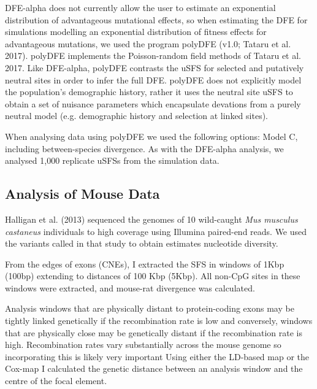 \documentclass[11pt]{article}
\begin{document}
		DFE-alpha does not currently allow the user to estimate an exponential distribution of advantageous mutational effects, so when estimating the DFE for simulations modelling an exponential distribution of fitness effects for advantageous mutations, we used the program polyDFE (v1.0; Tataru et al. 2017). polyDFE implements the Poisson-random field methods of Tataru et al. 2017. Like DFE-alpha, polyDFE contrasts the uSFS for selected and putatively neutral sites in order to infer the full DFE. polyDFE does not explicitly model the population's demographic history, rather it uses the neutral site uSFS to obtain a set of nuisance parameters which encapsulate devations from a purely neutral model (e.g. demographic history and selection at linked sites).
		
	 When analysing data using polyDFE we used the following options: Model C, including between-species divergence. As with the DFE-alpha analysis, we analysed 1,000 replicate uSFSs from the simulation data.

	\subsection*{Analysis of Mouse Data}

Halligan et al. (2013) sequenced the genomes of 10 wild-caught \emph{Mus musculus castaneus} individuals to high coverage using Illumina paired-end reads. We used the variants called in that study to obtain estimates nucleotide diversity.

	From the edges of exons (CNEs), I extracted the SFS in windows of 1Kbp (100bp) extending to distances of 100 Kbp (5Kbp). All non-CpG sites in these windows were extracted, and mouse-rat divergence was calculated. 
	
	Analysis windows that are physically distant to protein-coding exons may be tightly linked genetically if the recombination rate is low and conversely, windows that are physically close may be genetically distant if the recombination rate is high. Recombination rates vary substantially across the mouse genome so incorporating this is likely very important 
	Using either the LD-based map or the Cox-map I calculated the genetic distance between an analysis window and the centre of the focal element. 
\end{document}
